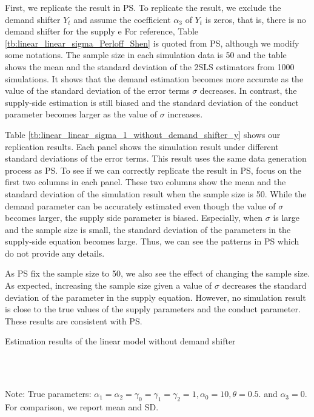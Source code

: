 \documentclass[11pt, a4paper]{article}
\begin{document}
First, we replicate the result in PS.
To replicate the result, we exclude the demand shifter $Y_t$ and assume the coefficient $\alpha_3$ of $Y_t$ is zeros, that is, there is no demand shifter for the supply e
For reference, Table \ref{tb:linear_linear_sigma_Perloff_Shen} is quoted from PS, although we modify some notations.
The sample size in each simulation data is 50 and the table shows the mean and the standard deviation of the 2SLS estimators from 1000 simulations.
It shows that the demand estimation becomes more accurate as the value of the standard deviation of the error terms $\sigma$ decreases.
In contrast, the supply-side estimation is still biased and the standard deviation of the conduct parameter becomes larger as the value of $\sigma$ increases.

Table \ref{tb:linear_linear_sigma_1_without_demand_shifter_y} shows our replication results.
Each panel shows the simulation result under different standard deviations of the error terms.
This result uses the same data generation process as PS. 
To see if we can correctly replicate the result in PS, focus on the first two columns in each panel.
These two columns show the mean and the standard deviation of the simulation result when the sample size is 50.
While the demand parameter can be accurately estimated even though the value of $\sigma$ becomes larger, the supply side parameter is biased.
Especially, when $\sigma$ is large and the sample size is small, the standard deviation of the parameters in the supply-side equation becomes large.
Thus, we can see the patterns in PS which do not provide any details.

As PS fix the sample size to 50, we also see the effect of changing the sample size.
As expected, increasing the sample size given a value of $\sigma$ decreases the standard deviation of the parameter in the supply equation.
However, no simulation result is close to the true values of the supply parameters and the conduct parameter.
These results are consistent with PS.

\begin{table}[!htbp]
  \begin{center}
      \caption{Estimation results of the linear model without demand shifter}
      \label{tb:linear_linear_sigma_1_without_demand_shifter_y} 
      \subfloat[$\sigma=0.001$]{}\\
      \subfloat[$\sigma=0.5$]{}\\
  \end{center}\footnotesize
  Note: True parameters: $\alpha_1 = \alpha_2 =  \gamma_0 = \gamma_1 = \gamma_2  =  1, \alpha_0 = 10, \theta = 0.5.$ and $\alpha_3 =0$. For comparison, we report mean and SD.
\end{table} 
\end{document}
